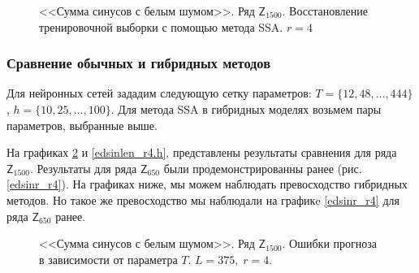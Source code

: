 \documentclass[specialist,
               substylefile = spbu.rtx,
               subf,href,colorlinks=true, 12p]{disser}
\begin{document}
\begin{figure}[H]
	\captionsetup{justification=centering}
	\caption{<<Сумма синусов с белым шумом>>. Ряд $\mathsf{Z}_{1500}$. Восстановление тренировочной выборки с помощью метода SSA. $r = 4$}
	\label{edsinlen_rec4}
\end{figure}

\subsubsection{Сравнение обычных и гибридных методов}

Для нейронных сетей зададим следующую сетку параметров: $T = \{12, 48, \ldots, 444 \}$, $h = \{10, 25, \ldots, 100 \}$. Для метода SSA в гибридных моделях возьмем пары параметров, выбранные выше.

На графиках \ref{edsinlen_r4} и \ref{edsinlen_r4.h}, представлены результаты сравнения для ряда $\mathsf{Z}_{1500}$. Результаты для ряда $\mathsf{Z}_{650}$ были продемонстрированны ранее (рис. \ref{edsinr_r4}). На графиках ниже, мы можем наблюдать превосходство гибридных методов. Но такое же превосходство мы наблюдали на графикe \ref{edsinr_r4} для ряда $\mathsf{Z}_{650}$ ранее.

\begin{figure}[H]
	\captionsetup{justification=centering}
	\caption{<<Сумма синусов с белым шумом>>. Ряд $\mathsf{Z}_{1500}$. Ошибки прогноза в зависимости от параметра $T$. $L = 375, \; r = 4$.}
	\label{edsinlen_r4}
\end{figure}
\end{document}
